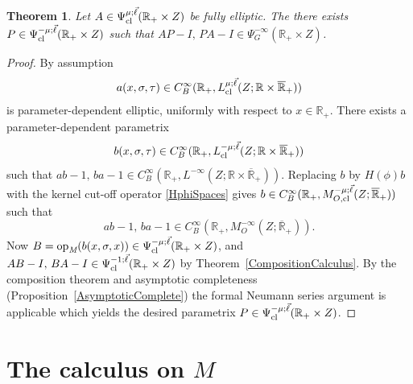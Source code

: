 \documentclass[reqno]{amsart}
\numberwithin{equation}{section}
\newtheorem{theorem}[equation]{Theorem}
\theoremstyle{definition}
\def\R{\mathbb R}
\def\opm{\textup{op}_{\textit{M}}}
\begin{document}
\begin{theorem}\label{ParametrixModel}
Let $A \in \Psi^{\mu;\vec{\ell}}_{\textup{cl}}(\R_+\times Z)$ be fully elliptic. The there exists $P \in \Psi^{-\mu;\vec{\ell}}_{\textup{cl}}(\R_+\times Z)$ such that $AP - I,\, PA  - I \in \Psi^{-\infty}_G(\R_+\times Z)$.
\end{theorem}
\begin{proof}
By assumption
$$
a(x,\sigma,\tau) \in C^{\infty}_B(\R_+,L^{\mu;\vec{\ell}}_{\textup{cl}}(Z;\R\times\overline{\R}_+))
$$
is parameter-dependent elliptic, uniformly with respect to $x \in \R_+$. There exists a parameter-dependent parametrix
$$
b(x,\sigma,\tau) \in C^{\infty}_B(\R_+,L^{-\mu;\vec{\ell}}_{\textup{cl}}(Z;\R\times\overline{\R}_+))
$$
such that $ab - 1,\, ba - 1 \in C^{\infty}_B(\R_+,L^{-\infty}(Z;\R\times\overline{\R}_+))$. Replacing $b$ by $H(\phi)b$ with the kernel cut-off operator \eqref{HphiSpaces} gives $b \in C^{\infty}_B(\R_+,M^{-\mu;\vec{\ell}}_{O,\textup{cl}}(Z;\overline{\R}_+))$ such that
$$
ab - 1,\,ba - 1 \in C^{\infty}_B(\R_+,M^{-\infty}_O(Z;\overline{\R}_+)).
$$
Now $B = \opm(b(x,\sigma,x)) \in \Psi^{-\mu;\vec{\ell}}_{\textup{cl}}(\R_+\times Z)$, and $AB - I,\, BA - I \in \Psi^{-1;\vec{\ell}}_{\textup{cl}}(\R_+\times Z)$ by Theorem~\ref{CompositionCalculus}. By the composition theorem and asymptotic completeness (Proposition~\ref{AsymptoticComplete}) the formal Neumann series argument is applicable which yields the desired parametrix $P \in \Psi^{-\mu;\vec{\ell}}_{\textup{cl}}(\R_+\times Z)$.
\end{proof}


\section{The calculus on $M$}
\end{document}
